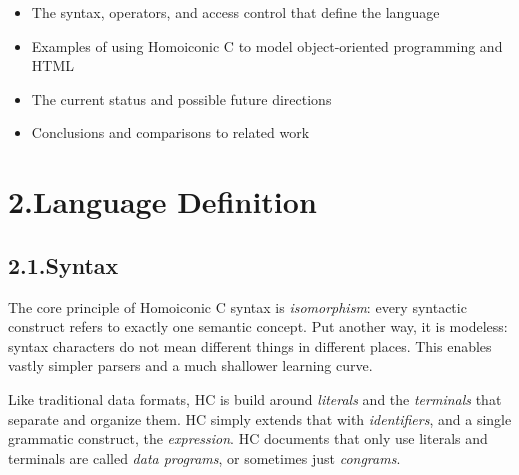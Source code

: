 \documentclass[preprint]{{sigplanconf}}
\begin{document}
\begin{itemize}[noitemsep,topsep=\mdcompacttopsep]%

\item{}The syntax, operators, and access control that define the language%

\item{}Examples of using Homoiconic C to model object-oriented programming and HTML%

\item{}The current status and possible future directions%

\item{}Conclusions and comparisons to related work%
\end{itemize}%

\section{2.\hspace*{0.5em}Language Definition}\label{sec-language-definition}%

\subsection{2.1.\hspace*{0.5em}Syntax}\label{sec-syntax}%

\noindent{}The core principle of Homoiconic C syntax is \emph{isomorphism}: every
syntactic construct refers to exactly one semantic concept. Put another
way, it is modeless: syntax characters do not mean different things in different
places. This enables vastly simpler parsers and a much shallower learning
curve.%

Like traditional data formats, HC is build around \emph{literals} and the
\emph{terminals} that separate and organize them. HC simply extends that with
\emph{identifiers}, and a single grammatic construct, the \emph{expression}. HC
documents that only use literals and terminals are called \emph{data
programs}, or sometimes just \emph{congrams}.%
\end{document}
